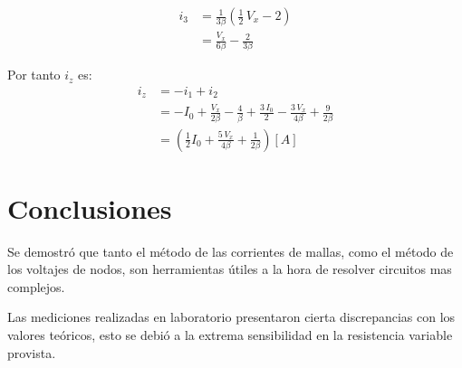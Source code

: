\documentclass[letter,11pt]{article}
\begin{document}
\begin{enumerate}
\begin{equation*}
    \begin{split}
        i_3
            &= \frac{1}{3\beta}(\frac{1}{2}\,V_x - 2) \\
            &= \frac{V_x}{6\beta} - \frac{2}{3\beta}
    \end{split}
\end{equation*}

Por tanto $i_z$ es:
\begin{equation*}
    \begin{split}
        i_z
            &= -i_1 + i_2 \\
            &= -I_0 + \frac{V_x}{2\beta} - \frac{4}{\beta} + \frac{3\,I_0}{2} - \frac{3\,V_x}{4\beta} + \frac{9}{2\beta} \\
            &= \left(\frac{1}{2}I_0 + \frac{5\,V_x}{4\beta} + \frac{1}{2\beta}\right) [A]
    \end{split}
\end{equation*}

\end{enumerate}

\section{Conclusiones}
Se demostró que tanto el método de las corrientes de mallas, como el método de
los voltajes de nodos, son herramientas útiles a la hora de resolver circuitos
mas complejos.

Las mediciones realizadas en laboratorio presentaron cierta discrepancias con
los valores teóricos, esto se debió a la extrema sensibilidad en la resistencia
variable provista.
\end{document}
